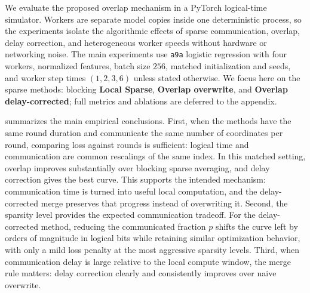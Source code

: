 \documentclass{article}
\theoremstyle{plain}
\theoremstyle{definition}
\begin{document}
We evaluate the proposed overlap mechanism in a PyTorch logical-time simulator.
Workers are separate model copies inside one deterministic process, so the experiments isolate the algorithmic effects of sparse communication, overlap, delay correction, and heterogeneous worker speeds without hardware or networking noise.
The main experiments use \texttt{a9a} logistic regression with four workers, normalized features, batch size $256$, matched initialization and seeds, and worker step times $(1,2,3,6)$ unless stated otherwise.
We focus here on the sparse methods: blocking \textbf{Local Sparse}, \textbf{Overlap overwrite}, and \textbf{Overlap delay-corrected}; full metrics and ablations are deferred to the appendix.

 summarizes the main empirical conclusions.
First, when the methods have the same round duration and communicate the same number of coordinates per round, comparing loss against rounds is sufficient: logical time and communication are common rescalings of the same index.
In this matched setting, overlap improves substantially over blocking sparse averaging, and delay correction gives the best curve.
This supports the intended mechanism: communication time is turned into useful local computation, and the delay-corrected merge preserves that progress instead of overwriting it.
Second, the sparsity level provides the expected communication tradeoff.
For the delay-corrected method, reducing the communicated fraction $p$ shifts the curve left by orders of magnitude in logical bits while retaining similar optimization behavior, with only a mild loss penalty at the most aggressive sparsity levels.
Third, when communication delay is large relative to the local compute window, the merge rule matters: delay correction clearly and consistently improves over naive overwrite.
\end{document}

